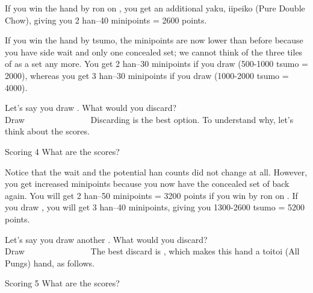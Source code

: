 \bigskip
\noindent If you win the hand by {\jap ron} on {\LARGE{}}, you get an additional {\jap yaku}, {\jap iipeiko} (Pure Double Chow), giving you 2 {\jap han}--40 minipoints = 2600 points.

\bigskip
If you win the hand by {\jap tsumo}, the minipoints are now lower than before because you have side wait and only one concealed set; we cannot think of the three tiles of {\LARGE{}} as a set any more. You get 2 {\jap han}--30 minipoints if you draw {\LARGE{}} (500-1000 {\jap tsumo} = 2000), whereas you get 3 {\jap han}--30 minipoints if you draw {\LARGE{}} (1000-2000 {\jap tsumo} = 4000).

\bigskip

Let's say you draw {\LARGE{}}. What would you discard?
\bp
{}\zhong\zhong\zhong~\\
\hfill\footnotesize{Draw~~~~~~~~~~~~~~~}
\ep
Discarding {\LARGE{}} is the best option. To understand why, let's think about the scores.

\begin{itembox}[r]{Scoring 4}
\bp
{}\zhong\zhong\zhong
\ep
\vspace{-10pt} What are the scores?
\end{itembox}

\bigskip
\noindent Notice that the wait and the potential {\jap han} counts did not change at all. However, you get increased minipoints because you now have the concealed set of {\LARGE{}} back again. You will get 2 {\jap han}--50 minipoints = 3200 points if you win by {\jap ron} on {\LARGE{}}. If you draw {\LARGE{}}, you will get 3 {\jap han}--40 minipoints, giving you 1300-2600 {\jap tsumo} = 5200 points.

\bigskip

Let's say you draw another {\LARGE{}}. What would you discard?
\bp
{}\zhong\zhong\zhong~\\
\hfill\footnotesize{Draw~~~~~~~~~~~~~~~}
\ep
The best discard is {\LARGE{}}, which makes this hand a {\jap toitoi} (All Pungs) hand, as follows.

\begin{itembox}[r]{Scoring 5}
\bp
{}\zhong\zhong\zhong
\ep
\vspace{-10pt} What are the scores?
\end{itembox}

